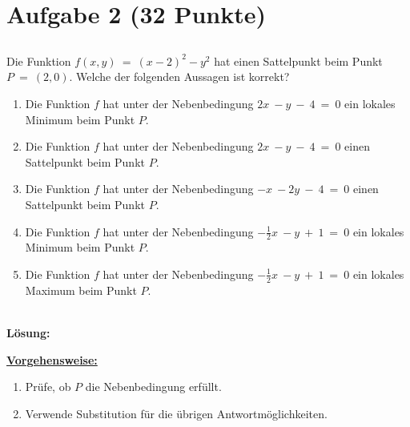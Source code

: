 \section*{Aufgabe 2 (32 Punkte)}
\vspace{0.4cm}
\subsection*{}
Die Funktion $ f(x,y) \ = \ (x-2)^2 -y^2 $ hat einen Sattelpunkt beim Punkt $ P \ = \ (2,0) $. Welche der folgenden Aussagen ist korrekt?
\renewcommand{\labelenumi}{(\alph{enumi})}
\begin{enumerate}
	\item Die Funktion $ f $ hat unter der Nebenbedingung $ 2x \ - y \ - \ 4 \ = \ 0 $ ein lokales Minimum beim Punkt $ P $.
	\item Die Funktion $ f $ hat unter der Nebenbedingung $ 2x \ - y \ - \ 4 \ = \ 0 $ einen Sattelpunkt beim Punkt $ P $.
	\item Die Funktion $ f $ hat unter der Nebenbedingung $ -x \ - 2y \ - \ 4 \ = \ 0 $ einen Sattelpunkt beim Punkt $ P $.
	\item Die Funktion $ f $ hat unter der Nebenbedingung $ -\frac{1}{2}x \ - y \ + \ 1 \ = \ 0 $ ein lokales Minimum beim Punkt $ P $.
	\item Die Funktion $ f $ hat unter der Nebenbedingung $ -\frac{1}{2}x \ - y \ + \ 1 \ = \ 0 $ ein lokales Maximum beim Punkt $ P $.
\end{enumerate}
\ \\
\textbf{Lösung:}
\begin{mdframed}
\underline{\textbf{Vorgehensweise:}}
\renewcommand{\labelenumi}{\theenumi.}
\begin{enumerate}
\item Prüfe, ob $ P $ die Nebenbedingung erfüllt.
\item Verwende Substitution für die übrigen Antwortmöglichkeiten.
\end{enumerate}
\end{mdframed}

